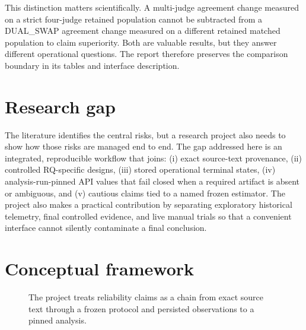 This distinction matters scientifically. A multi-judge agreement change measured on a strict four-judge retained population cannot be subtracted from a DUAL\_SWAP agreement change measured on a different retained matched population to claim superiority. Both are valuable results, but they answer different operational questions. The report therefore preserves the comparison boundary in its tables and interface description.

\section{Research gap}

The literature identifies the central risks, but a research project also needs to show how those risks are managed end to end. The gap addressed here is an integrated, reproducible workflow that joins: (i) exact source-text provenance, (ii) controlled RQ-specific designs, (iii) stored operational terminal states, (iv) analysis-run-pinned API values that fail closed when a required artifact is absent or ambiguous, and (v) cautious claims tied to a named frozen estimator. The project also makes a practical contribution by separating exploratory historical telemetry, final controlled evidence, and live manual trials so that a convenient interface cannot silently contaminate a final conclusion.

\section{Conceptual framework}

\begin{figure}[H]
\centering
{}
\caption{The project treats reliability claims as a chain from exact source text through a frozen protocol and persisted observations to a pinned analysis.}
\label{fig:conceptual-framework}
\end{figure}

